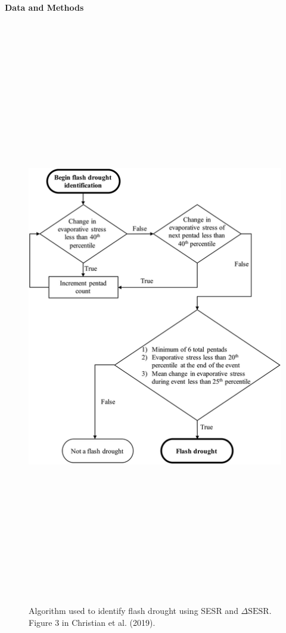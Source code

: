 \documentclass{beamer}
\begin{document}
\begin{frame}[t]{}
\begin{columns}[t]
\begin{creambox}
\begin{block}{\bfseries Data and Methods}
\begin{columns}[t]
						\begin{figure}
							\includegraphics[height = 10in, frame]{../Figures/Poster/Christian_2019_Fig3.png}
							\caption{\normalsize Algorithm used to identify flash drought using SESR and $\Delta \text{SESR}$. Figure 3 in Christian et al. (2019).}%
						\end{figure}
					\end{columns}
				\end{block}
			\end{creambox}
			

\end{columns}
\end{frame}
\end{document}
